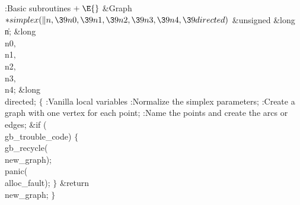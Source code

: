 \fi

\B{}:Basic subroutines\X${}\mathrel+\E{}$\6
\&{Graph} ${}{*}\\{simplex}(\|n,\39\\{n0},\39\\{n1},\39\\{n2},\39\\{n3},\39%
\\{n4},\39\\{directed}){}$\1\1\6
\&{unsigned} \&{long} \|n;\6
\&{long} \\{n0}${},{}$ \\{n1}${},{}$ \\{n2}${},{}$ \\{n3}${},{}$ \\{n4};\6
\&{long} \\{directed};\2\2\6
${}\{{}$\5
\1:Vanilla local variables\X\7
:Normalize the simplex parameters\X;\6
:Create a graph with one vertex for each point\X;\6
:Name the points and create the arcs or edges\X;\6
\&{if} (\\{gb\_trouble\_code})\5
${}\{{}$\1\6
\\{gb\_recycle}(\\{new\_graph});\6
\\{panic}(\\{alloc\_fault});\6
\4${}\}{}$\2\6
\&{return} \\{new\_graph};\6
\4${}\}{}$\2\par
\fi

